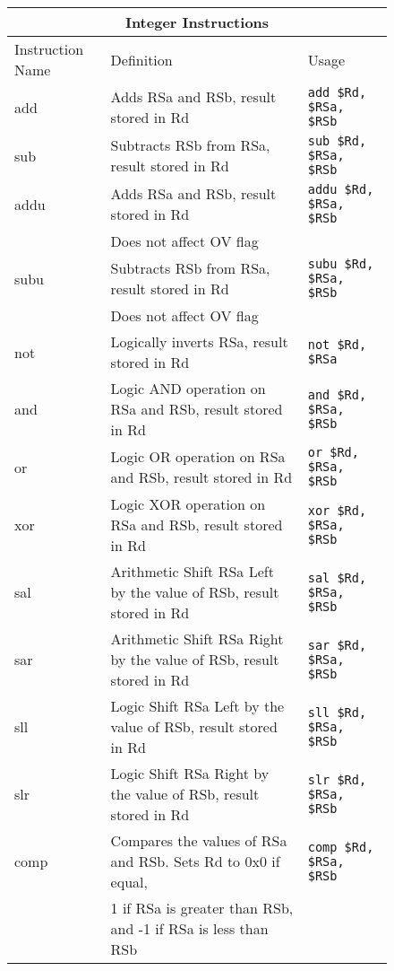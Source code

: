 \documentclass[letterpaper, 11pt]{article}
\begin{document}
\begin{figure}[!h]
	\begin{center}
		\begin{tabular}{|l|l|l|}
			\hline
			\multicolumn{3}{c}{Integer Instructions} \\ \hline
			Instruction Name	& Definition															& Usage 							\\ \hline
			add					& Adds RSa and RSb, result stored in Rd									& \texttt{add \$Rd, \$RSa, \$RSb}	\\ \hline
			sub					& Subtracts RSb from RSa, result stored in Rd							& \texttt{sub \$Rd, \$RSa, \$RSb}	\\ \hline
			addu 				& Adds RSa and RSb, result stored in Rd 								& \texttt{addu \$Rd, \$RSa, \$RSb}	\\ 
			\hfill				& Does not affect OV flag												& \hfill 							\\ \hline
			subu 				& Subtracts RSb from RSa, result stored in Rd							& \texttt{subu \$Rd, \$RSa, \$RSb}	\\ 
			\hfill				& Does not affect OV flag												& \hfill 							\\ \hline
			not					& Logically inverts RSa, result stored in Rd							& \texttt{not \$Rd, \$RSa} 			\\ \hline
			and					& Logic AND operation on RSa and RSb, result stored in Rd				& \texttt{and \$Rd, \$RSa, \$RSb}	\\ \hline	
			or					& Logic OR operation on RSa and RSb, result stored in Rd				& \texttt{or \$Rd, \$RSa, \$RSb	}	\\ \hline	
			xor					& Logic XOR operation on RSa and RSb, result stored in Rd				& \texttt{xor \$Rd, \$RSa, \$RSb}	\\ \hline	
			sal					& Arithmetic Shift RSa Left by the value of RSb, result stored in Rd	& \texttt{sal \$Rd, \$RSa, \$RSb}	\\ \hline	
			sar					& Arithmetic Shift RSa Right by the value of RSb, result stored in Rd	& \texttt{sar \$Rd, \$RSa, \$RSb}	\\ \hline	
			sll					& Logic Shift RSa Left by the value of RSb, result stored in Rd			& \texttt{sll \$Rd, \$RSa, \$RSb}	\\ \hline	
			slr					& Logic Shift RSa Right by the value of RSb, result stored in Rd		& \texttt{slr \$Rd, \$RSa, \$RSb}	\\ \hline	
			comp				& Compares the values of RSa and RSb. Sets Rd to 0x0 if equal,			& \texttt{comp \$Rd, \$RSa, \$RSb}	\\
			\hfill				& 1 if RSa is greater than RSb, and -1 if RSa is less than RSb			&	\hfill							\\ \hline
		\end{tabular} 
	\end{center}
	
\end{figure} 
\end{document}
